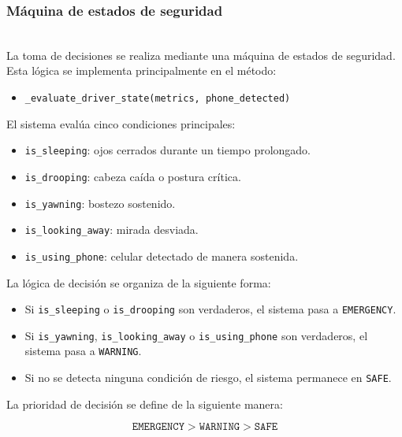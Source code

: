 \documentclass[conference]{IEEEtran}
\begin{document}
\subsubsection{Máquina de estados de seguridad}\mbox{}\\

La toma de decisiones se realiza mediante una máquina de estados de seguridad. Esta lógica se implementa principalmente en el método:

\begin{itemize}
    \item \texttt{\_evaluate\_driver\_state(metrics, phone\_detected)}
\end{itemize}

El sistema evalúa cinco condiciones principales:

\begin{itemize}
    \item \texttt{is\_sleeping}: ojos cerrados durante un tiempo prolongado.
    
    \item \texttt{is\_drooping}: cabeza caída o postura crítica.
    
    \item \texttt{is\_yawning}: bostezo sostenido.
    
    \item \texttt{is\_looking\_away}: mirada desviada.
    
    \item \texttt{is\_using\_phone}: celular detectado de manera sostenida.
\end{itemize}

La lógica de decisión se organiza de la siguiente forma:

\begin{itemize}
    \item Si \texttt{is\_sleeping} o \texttt{is\_drooping} son verdaderos, el sistema pasa a \texttt{EMERGENCY}.
    
    \item Si \texttt{is\_yawning}, \texttt{is\_looking\_away} o \texttt{is\_using\_phone} son verdaderos, el sistema pasa a \texttt{WARNING}.
    
    \item Si no se detecta ninguna condición de riesgo, el sistema permanece en \texttt{SAFE}.
\end{itemize}

La prioridad de decisión se define de la siguiente manera:

\begin{equation}
\texttt{EMERGENCY} > \texttt{WARNING} > \texttt{SAFE}
\end{equation}
\end{document}
